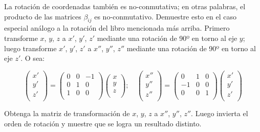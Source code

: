\documentclass[a4paper,12pt,twoside,final,spanish]{article}
\begin{document}
La rotación de coordenadas también es no-conmutativa; en otras palabras, el producto de las matrices $\beta_{ij}$ es no-conmutativo. Demuestre esto en el caso especial análogo a la rotación del libro mencionada más arriba. Primero transforme $x$, $y$, $z$ a $x'$, $y'$, $z'$ mediante una rotación de 90º en torno al eje $y$; luego transforme $x'$, $y'$, $z'$ a $x''$, $y''$, $z''$ mediante una rotación de 90º en torno al eje $z'$. O sea:

\[
\left(\begin{matrix}
x'\\
y'\\
z'\\
\end{matrix}\right)=
\left(\begin{matrix}
0 & 0 & -1\\
0 & 1 & 0\\
1 & 0 & 0\\
\end{matrix}\right)
\left(\begin{matrix}
x\\
y\\
z\\
\end{matrix}\right);\quad
\left(\begin{matrix}
x''\\
y''\\
z''\\
\end{matrix}\right)=
\left(\begin{matrix}
0 & 1 & 0\\
-1 & 0 & 0\\
0 & 0 & 1\\
\end{matrix}\right)
\left(\begin{matrix}
x'\\
y'\\
z'\\
\end{matrix}\right)
\]
 
Obtenga la matriz de transformación de $x$, $y$, $z$ a $x''$, $y''$, $z''$. Luego invierta el orden de rotación y muestre que se logra un resultado distinto.  
\end{document}
